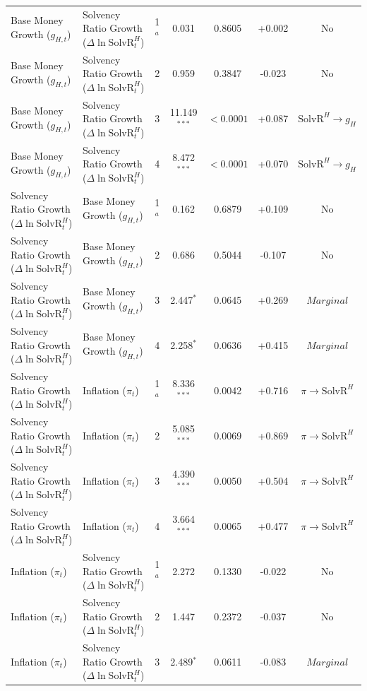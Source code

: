 \begin{table}[p]
{\begin{tabular}{llccccc}
Base Money Growth ($g_{H,t}$) & Solvency Ratio Growth ($\Delta \ln \text{SolvR}_t^H$) & 1$^a$ & 0.031 & 0.8605 & +0.002 & No \\
Base Money Growth ($g_{H,t}$) & Solvency Ratio Growth ($\Delta \ln \text{SolvR}_t^H$) & 2 & 0.959 & 0.3847 & -0.023 & No \\
Base Money Growth ($g_{H,t}$) & Solvency Ratio Growth ($\Delta \ln \text{SolvR}_t^H$) & 3 & 11.149$^{***}$ & $< 0.0001$ & +0.087 & $\text{SolvR}^H \to g_H$ \\
Base Money Growth ($g_{H,t}$) & Solvency Ratio Growth ($\Delta \ln \text{SolvR}_t^H$) & 4 & 8.472$^{***}$ & $< 0.0001$ & +0.070 & $\text{SolvR}^H \to g_H$ \\
Solvency Ratio Growth ($\Delta \ln \text{SolvR}_t^H$) & Base Money Growth ($g_{H,t}$) & 1$^a$ & 0.162 & 0.6879 & +0.109 & No \\
Solvency Ratio Growth ($\Delta \ln \text{SolvR}_t^H$) & Base Money Growth ($g_{H,t}$) & 2 & 0.686 & 0.5044 & -0.107 & No \\
Solvency Ratio Growth ($\Delta \ln \text{SolvR}_t^H$) & Base Money Growth ($g_{H,t}$) & 3 & 2.447$^{*}$ & 0.0645 & +0.269 & $Marginal$ \\
Solvency Ratio Growth ($\Delta \ln \text{SolvR}_t^H$) & Base Money Growth ($g_{H,t}$) & 4 & 2.258$^{*}$ & 0.0636 & +0.415 & $Marginal$ \\
Solvency Ratio Growth ($\Delta \ln \text{SolvR}_t^H$) & Inflation ($\pi_t$) & 1$^a$ & 8.336$^{***}$ & 0.0042 & +0.716 & $\pi \to \text{SolvR}^H$ \\
Solvency Ratio Growth ($\Delta \ln \text{SolvR}_t^H$) & Inflation ($\pi_t$) & 2 & 5.085$^{***}$ & 0.0069 & +0.869 & $\pi \to \text{SolvR}^H$ \\
Solvency Ratio Growth ($\Delta \ln \text{SolvR}_t^H$) & Inflation ($\pi_t$) & 3 & 4.390$^{***}$ & 0.0050 & +0.504 & $\pi \to \text{SolvR}^H$ \\
Solvency Ratio Growth ($\Delta \ln \text{SolvR}_t^H$) & Inflation ($\pi_t$) & 4 & 3.664$^{***}$ & 0.0065 & +0.477 & $\pi \to \text{SolvR}^H$ \\
Inflation ($\pi_t$) & Solvency Ratio Growth ($\Delta \ln \text{SolvR}_t^H$) & 1$^a$ & 2.272 & 0.1330 & -0.022 & No \\
Inflation ($\pi_t$) & Solvency Ratio Growth ($\Delta \ln \text{SolvR}_t^H$) & 2 & 1.447 & 0.2372 & -0.037 & No \\
Inflation ($\pi_t$) & Solvency Ratio Growth ($\Delta \ln \text{SolvR}_t^H$) & 3 & 2.489$^{*}$ & 0.0611 & -0.083 & $Marginal$ \\

\end{tabular}}
\end{table}
